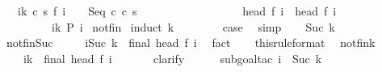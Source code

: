 \begin{isabellebody}
\ \ \ {\isachardoublequoteopen}{\isasymforall}i{\isacharless}k{\isachardot}\ {\isacharparenleft}{\isasymexists}c{\isacharprime}\ s{\isacharprime}{\isachardot}\ f\ {\isacharparenleft}i\ {\isacharplus}\ {}{\isacharparenright}\ {\isacharequal}\ {\isacharparenleft}Seq\ c{\isacharprime}\ c\ s{\isacharprime}{\isacharparenright}{\isacharparenright}\ {\isasymand}\ \ \isanewline
\ \ \ \ \ \ \ \ \ \ \ \ \ \ \ {\isasymGamma}{\isasymturnstile}head\ {\isacharparenleft}f\ i{\isacharparenright}\ {\isasymrightarrow}\ head\ {\isacharparenleft}f\ {\isacharparenleft}i{\isacharplus}{}{\isacharparenright}{\isacharparenright}{\isachardoublequoteclose}\isanewline
\ \ \ \ \ \ \ \ {\isacharparenleft}\ {\isachardoublequoteopen}{\isasymforall}i{\isacharless}k{\isachardot}\ {\isacharquery}P\ i{\isachardoublequoteclose}{\isacharparenright}\isanewline
%
\isadelimproof
%
\endisadelimproof
%
\isatagproof
{}\isamarkupfalse%
\ not{\isacharunderscore}fin\isanewline
{}\isamarkupfalse%
\ {\isacharparenleft}induct\ k{\isacharparenright}\isanewline
\ \ \isamarkupfalse%
\ {}\isanewline
\ \ \isamarkupfalse%
\ {\isacharquery}case\ \isamarkupfalse%
\ simp\isanewline
{}\isamarkupfalse%
\isanewline
\ \ \isamarkupfalse%
\ {\isacharparenleft}Suc\ k{\isacharparenright}\isanewline
\ \ \isamarkupfalse%
\ not{\isacharunderscore}fin{\isacharunderscore}Suc{\isacharcolon}\ \isanewline
\ \ \ \ {\isachardoublequoteopen}{\isasymforall}i{\isacharless}Suc\ k{\isachardot}\ {\isasymnot}\ final\ {\isacharparenleft}head\ {\isacharparenleft}f\ i{\isacharparenright}{\isacharparenright}{\isachardoublequoteclose}\ \isamarkupfalse%
\ fact\isanewline
\ \ \isamarkupfalse%
\ this{\isacharbrackleft}rule{\isacharunderscore}format{\isacharbrackright}\ \isamarkupfalse%
\ not{\isacharunderscore}fin{\isacharunderscore}k{\isacharcolon}\ \isanewline
\ \ \ \ {\isachardoublequoteopen}{\isasymforall}i{\isacharless}k{\isachardot}\ {\isasymnot}\ final\ {\isacharparenleft}head\ {\isacharparenleft}f\ i{\isacharparenright}{\isacharparenright}{\isachardoublequoteclose}\ \isanewline
\ \ \ \ \isamarkupfalse%
\ clarify\isanewline
\ \ \ \ \isamarkupfalse%
\ {\isacharparenleft}subgoal{\isacharunderscore}tac\ {\isachardoublequoteopen}i\ {\isacharless}\ Suc\ k{\isachardoublequoteclose}{\isacharparenright}\isanewline
\ \ \ \ \isamarkupfalse%

\end{isabellebody}
